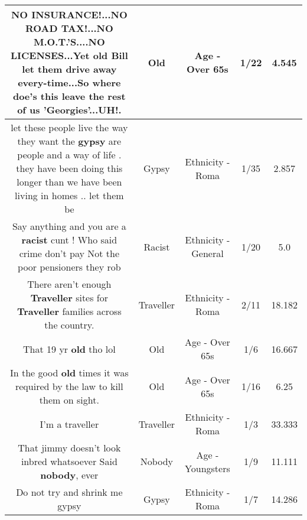 \documentclass[11pt]{article}
\newlength\mylength
\begin{document}
\begin{center}
\begin{longtable}{|C{.65\mylength}|C{.30\mylength}|C{.12\mylength}|C{.12\mylength}|C{.12\mylength}|}
  \small NO INSURANCE!...NO ROAD TAX!...NO M.O.T.'S....NO LICENSES...Yet \textbf{old} Bill let them drive away  every-time...So where doe's this leave the rest of us 'Georgies'...UH!.\normalsize   & Old & Age - Over 65s & 1/22 & 4.545 \\  \hline
  \small let these people live the way they want the \textbf{gypsy} are people and a way of life . they have been doing this longer than we have been living in homes .. let them be\normalsize   & Gypsy & Ethnicity - Roma & 1/35 & 2.857 \\  \hline
  \small Say anything and you are a \textbf{racist} cunt ! Who said crime don't pay Not the poor pensioners they rob\normalsize   & Racist & Ethnicity - General & 1/20 & 5.0 \\  \hline
  \small There aren't enough \textbf{Traveller} sites for \textbf{Traveller} families across the country.\normalsize   & Traveller & Ethnicity - Roma & 2/11 & 18.182 \\  \hline
  \small That 19 yr \textbf{old} tho lol\normalsize   & Old & Age - Over 65s & 1/6 & 16.667 \\  \hline
  \small In the good \textbf{old} times it was required by the law to kill them on sight.\normalsize   & Old & Age - Over 65s & 1/16 & 6.25 \\  \hline
  \small I'm a traveller\normalsize   & Traveller & Ethnicity - Roma & 1/3 & 33.333 \\  \hline
  \small That jimmy doesn't look inbred whatsoever Said \textbf{nobody}, ever\normalsize   & Nobody & Age - Youngsters & 1/9 & 11.111 \\  \hline
  \small Do not try and shrink me gypsy\normalsize   & Gypsy & Ethnicity - Roma & 1/7 & 14.286 \\  \hline

\end{longtable}
\end{center}
\end{document}
